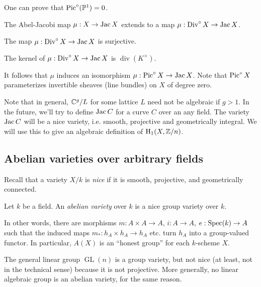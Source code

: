 \documentclass{article}
\begin{document}
\begin{example}
One can prove that $\operatorname{Pic}^\circ(\mathbb{P}^1) = 0$.
\end{example}

The Abel-Jacobi map $\mu:X\to \operatorname{Jac} X$ extends to a map 
$\mu:\operatorname{Div}^\circ X\to \operatorname{Jac} X$. 

\begin{theorem}[Jacobi]
The map $\mu:\operatorname{Div}^\circ X\to\operatorname{Jac} X$ is surjective.
\end{theorem}

\begin{theorem}[Abel]
The kernel of $\mu:\operatorname{Div}^\circ X\to \operatorname{Jac} X$ is $\operatorname{div}(K^\times)$. 
\end{theorem}

It follows that $\mu$ induces an isomorphism $\mu:\operatorname{Pic}^\circ X\to \operatorname{Jac} X$. 
Note that $\operatorname{Pic}^\circ X$ parameterizes invertible sheaves (line bundles) on 
$X$ of degree zero. 

Note that in general, $\mathbb{C}^g/L$ for some lattice $L$ need not be 
algebraic if $g>1$. In the future, we'll try to define $\operatorname{Jac} C$ for a curve 
$C$ over an any field. The variety $\operatorname{Jac} C$ will be a nice variety, i.e. 
smooth, projective and geometrically integral. We will use this to give an 
algebraic definition of $\operatorname{H}_1(X,\mathbb{Z}/n)$. 





\subsection*{Abelian varieties over arbitrary fields}

Recall that a variety $X/k$ is \emph{nice} if it is smooth, projective, and 
geometrically connected. 

\begin{definition}
Let $k$ be a field. An \emph{abelian variety} over $k$ is a nice group variety 
over $k$.
\end{definition}

In other words, there are morphisms $m:A\times A\to A$, $i:A\to A$, 
$e:\operatorname{Spec}(k)\to A$ such that the induced maps $m_*:h_A\times h_A\to h_A$ etc. 
turn $h_A$ into a group-valued functor. In particular, $A(X)$ is an ``honest  
group'' for each $k$-scheme $X$. 

\begin{example}
The general linear group $\operatorname{GL}(n)$ is a group variety, but not 
nice (at least, not in the technical sense) because it is not projective. More 
generally, no linear algebraic group is an abelian variety, for the same 
reason. 
\end{example}
\end{document}
